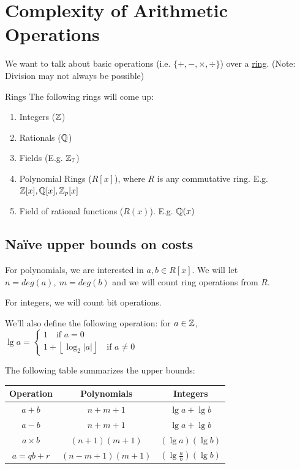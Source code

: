 
\section{Complexity of Arithmetic Operations}

We want to talk about basic operations (i.e. $\{+, -, \times, \div \}$) over a \underline{ring}. (Note: Division may not always be possible)

\begin{example}{Rings}{}
    The following rings will come up:
    \begin{enumerate}
        \item Integers ($\operatorname{\mathbb{Z}}$)
        \item Rationals ($\operatorname{\mathbb{Q}}$)
        \item Fields (E.g. $\operatorname{\mathbb{Z}}_7$)
        \item Polynomial Rings ($R[x]$), where $R$ is any commutative ring. E.g. $\operatorname{\mathbb{Z}}[x], \operatorname{\mathbb{Q}}[x], \operatorname{\mathbb{Z}}_p[x]$
        \item Field of rational functions ($R(x)$). E.g. $\operatorname{\mathbb{Q}}(x)$
    \end{enumerate}
\end{example}

\subsection{Naïve upper bounds on costs}
For polynomials, we are interested in $a,b \in R[x]$. We will let $n = deg(a),\ m = deg(b)$ and we will count ring operations from $R$.

For integers, we will count bit operations.

We'll also define the following operation: for $a \in \operatorname{\mathbb{Z}}$, $\lg a = \begin{cases}1 \quad \text{if } a = 0 \\ 1 + \left \lfloor \log_2 |a| \right\rfloor \quad \text{if } a \neq 0 \end{cases}$

The following table summarizes the upper bounds:
\begin{center}
\begin{tabular}{c|c|c}
    Operation & Polynomials & Integers \\
    \hline
    $a + b$ & $n + m + 1$ & $\lg a + \lg b$\\
    $a - b$ & $n + m + 1$ & $\lg a + \lg b$\\
    $a \times b$ & $(n+1)(m+1)$ & $(\lg a)(\lg b)$\\
    $a = qb + r$ & $(n-m+1)(m+1)$ & $(\lg \frac{a}{b})(\lg b)$
\end{tabular}
\end{center}

